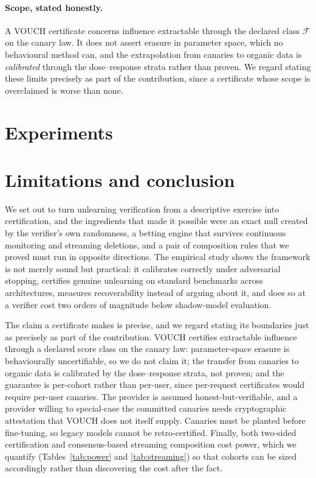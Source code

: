 \documentclass[pdflatex,sn-mathphys-num]{sn-jnl}
\theoremstyle{thmstyleone}
\theoremstyle{thmstyletwo}
\theoremstyle{thmstylethree}
\newcommand{\F}{\mathcal{F}}
\begin{document}
\paragraph{Scope, stated honestly.} A VOUCH certificate concerns influence extractable
through the declared class $\F$ on the canary law. It does not assert erasure in
parameter space, which no behavioural method can, and the extrapolation from canaries to
organic data is \emph{calibrated} through the dose--response strata rather than proven.
We regard stating these limits precisely as part of the contribution, since a
certificate whose scope is overclaimed is worse than none.

\section{Experiments}\label{sec:exp}


\section{Limitations and conclusion}\label{sec:conclusion}

We set out to turn unlearning verification from a descriptive exercise into
certification, and the ingredients that made it possible were an exact null created by
the verifier's own randomness, a betting engine that survives continuous monitoring and
streaming deletions, and a pair of composition rules that we proved must run in opposite
directions. The empirical study shows the framework is not merely sound but practical:
it calibrates correctly under adversarial stopping, certifies genuine unlearning on
standard benchmarks across architectures, measures recoverability instead of arguing
about it, and does so at a verifier cost two orders of magnitude below shadow-model
evaluation.

The claim a certificate makes is precise, and we regard stating its boundaries just as
precisely as part of the contribution. VOUCH certifies extractable influence through a
declared score class on the canary law: parameter-space erasure is behaviourally
uncertifiable, so we do not claim it; the transfer from canaries to organic data is
calibrated by the dose--response strata, not proven; and the guarantee is per-cohort
rather than per-user, since per-request certificates would require per-user canaries.
The provider is assumed honest-but-verifiable, and a provider willing to special-case
the committed canaries needs cryptographic attestation that VOUCH does not itself
supply. Canaries must be planted before fine-tuning, so legacy models cannot be
retro-certified. Finally, both two-sided certification and consensus-based streaming
composition cost power, which we quantify (Tables~\ref{tab:power} and
\ref{tab:streaming}) so that cohorts can be sized accordingly rather than discovering
the cost after the fact.
\end{document}
